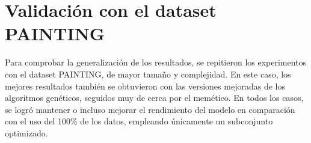 \section{Validación con el dataset PAINTING}\label{sec:validacion-con-el-dataset-painting}
Para comprobar la generalización de los resultados, se repitieron los experimentos con el dataset PAINTING, de mayor tamaño y complejidad.
En este caso, los mejores resultados también se obtuvieron con las versiones mejoradas de los algoritmos genéticos, seguidos muy de cerca por el memético.
En todos los casos, se logró mantener o incluso mejorar el rendimiento del modelo en comparación con el uso del 100\% de los datos, empleando únicamente
un subconjunto optimizado.